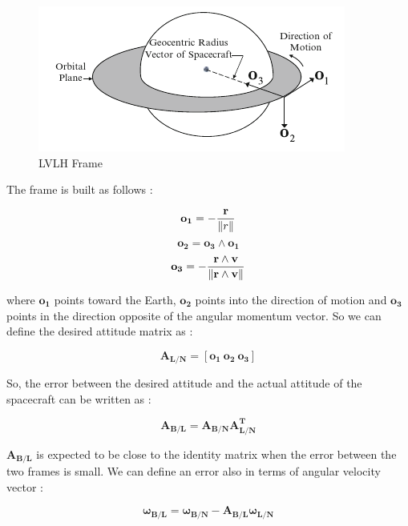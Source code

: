 \documentclass[11pt,a4paper]{report}
\begin{document}
\begin{figure}[H]
 	\centering
 	\includegraphics[scale=0.6]{gfx/lvlh.png}
    \caption{LVLH Frame}
    \label{fig:lvlh}
\end{figure}

The frame is built as follows : 

\begin{equation*}
 \mathbf{o_1} = - \frac{\mathbf{r}}{\left\lVert r\right\rVert} 
\end{equation*}
\begin{equation*}
 \mathbf{o_2} = \mathbf{o_3} \wedge \mathbf{o_1}
\end{equation*}
\begin{equation*}
 \mathbf{o_3} = - \frac{\mathbf{r} \wedge \mathbf{v}}{\left\lVert\mathbf{r} \wedge \mathbf{v}\right\rVert}
\end{equation*}

where $\mathbf{o_1}$ points toward the Earth, $\mathbf{o_2}$ points into the direction of motion and $\mathbf{o_3}$ points in the direction opposite of the angular momentum vector.
So we can define the desired attitude matrix as : 

\begin{equation}
 \mathbf{A_{L/N}} =  [\mathbf{o_1} \ \mathbf{o_2} \ \mathbf{o_3}]
\end{equation}

So, the error between the desired attitude and the actual attitude of the spacecraft can be written as : 

\begin{equation}
 \mathbf{A_{B/L}} =  \mathbf{A_{B/N}} \mathbf{A_{L/N}^T}
\end{equation}

$\mathbf{A_{B/L}}$ is expected to be close to the identity matrix when the error between the two frames is small.
We can define an error also in terms of angular velocity vector : 

\begin{equation}
 \mathbf{\omega_{B/L}} = \mathbf{\omega_{B/N}} - \mathbf{A_{B/L}}\mathbf{\omega_{L/N}}
\end{equation}
\end{document}
